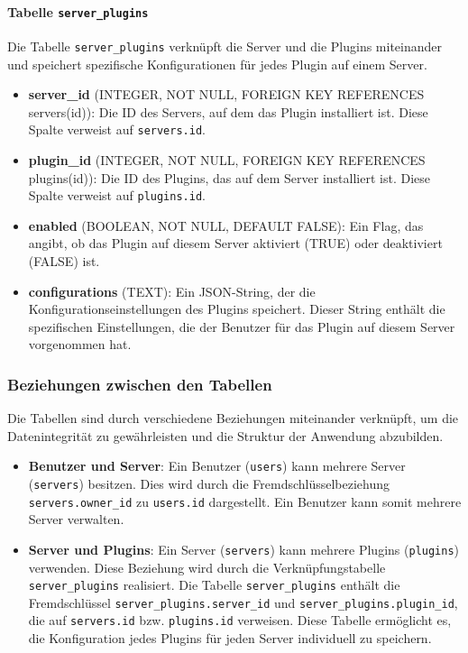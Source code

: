 \paragraph{\texorpdfstring{Tabelle
\texttt{server\_plugins}}{Tabelle server\_plugins}}\label{tabelle-server_plugins}

Die Tabelle \texttt{server\_plugins} verknüpft die Server und die
Plugins miteinander und speichert spezifische Konfigurationen für jedes
Plugin auf einem Server.

\begin{itemize}
\item
  \textbf{server\_id} (INTEGER, NOT NULL, FOREIGN KEY REFERENCES
  servers(id)): Die ID des Servers, auf dem das Plugin installiert ist.
  Diese Spalte verweist auf \texttt{servers.id}.
\item
  \textbf{plugin\_id} (INTEGER, NOT NULL, FOREIGN KEY REFERENCES
  plugins(id)): Die ID des Plugins, das auf dem Server installiert ist.
  Diese Spalte verweist auf \texttt{plugins.id}.
\item
  \textbf{enabled} (BOOLEAN, NOT NULL, DEFAULT FALSE): Ein Flag, das
  angibt, ob das Plugin auf diesem Server aktiviert (TRUE) oder
  deaktiviert (FALSE) ist.
\item
  \textbf{configurations} (TEXT): Ein JSON-String, der die
  Konfigurationseinstellungen des Plugins speichert. Dieser String
  enthält die spezifischen Einstellungen, die der Benutzer für das
  Plugin auf diesem Server vorgenommen hat.
\end{itemize}

\subsubsection{Beziehungen zwischen den
Tabellen}\label{beziehungen-zwischen-den-tabellen}

Die Tabellen sind durch verschiedene Beziehungen miteinander verknüpft,
um die Datenintegrität zu gewährleisten und die Struktur der Anwendung
abzubilden.

\begin{itemize}
\item
  \textbf{Benutzer und Server}: Ein Benutzer (\texttt{users}) kann
  mehrere Server (\texttt{servers}) besitzen. Dies wird durch die
  Fremdschlüsselbeziehung \texttt{servers.owner\_id} zu
  \texttt{users.id} dargestellt. Ein Benutzer kann somit mehrere Server
  verwalten.
\item
  \textbf{Server und Plugins}: Ein Server (\texttt{servers}) kann
  mehrere Plugins (\texttt{plugins}) verwenden. Diese Beziehung wird
  durch die Verknüpfungstabelle \texttt{server\_plugins} realisiert. Die
  Tabelle \texttt{server\_plugins} enthält die Fremdschlüssel
  \texttt{server\_plugins.server\_id} und
  \texttt{server\_plugins.plugin\_id}, die auf \texttt{servers.id} bzw.
  \texttt{plugins.id} verweisen. Diese Tabelle ermöglicht es, die
  Konfiguration jedes Plugins für jeden Server individuell zu speichern.
\end{itemize}


